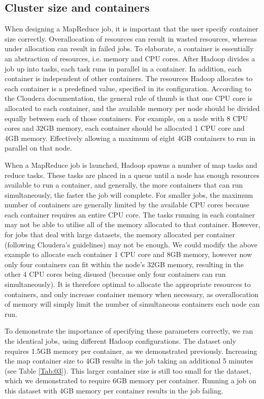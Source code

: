 \documentclass{bioinfo}
\begin{document}
\subsection*{Cluster size and containers}
When designing a MapReduce job, it is important that the user specify container size correctly. Overallocation of resources can result in wasted resources, whereas under allocation can result in failed jobs.
To elaborate, a container is essentially an abstraction of resources, i.e. memory and CPU cores. After Hadoop divides a job up into tasks, each task runs in parallel in a container. In addition, each container is independent of other containers.
The resources Hadoop allocates to each container is a predefined value, specified in its configuration. According to the Cloudera documentation, the general rule of thumb is that one CPU core is allocated to each container, and the available memory per node should be divided equally between each of those containers. For example, on a node with 8 CPU cores and 32GB memory, each container should be allocated 1 CPU core and 4GB memory. Effectively allowing a maximum of eight 4GB containers to run in parallel on that node.

When a MapReduce job is launched, Hadoop spawns a number of map tasks and reduce tasks. These tasks are placed in a queue until a node has enough resources available to run a container, and generally, the more containers that can run simultaneously, the faster the job will complete.
For smaller jobs, the maximum number of containers are generally limited by the available CPU cores because each container requires an entire CPU core. The tasks running in each container may not be able to utilise all of the memory allocated to that container.
However, for jobs that deal with large datasets, the memory allocated per container (following Cloudera's guidelines) may not be enough.
We could modify the above example to allocate each container 1 CPU core and 8GB memory, however now only four containers can fit within the node's 32GB memory, resulting in the other 4 CPU cores being disused (because only four containers can run simultaneously). It is therefore optimal to
allocate the appropriate resources to containers, and only increase container memory when necessary, as overallocation of memory will simply limit the number of simultaneous containers each node can run.

To demonstrate the importance of specifying these parameters correctly, we ran the identical jobs, using different Hadoop configurations. The \OnePhaseone{} dataset only requires 1.5GB memory per container, as we demonstrated previously.
Increasing the map container size to 4GB results in the job taking an additional 5 minutes (see Table \ref{Tab:03}).
This larger container size is still too small for the \FullPhasethree{} dataset, which we demonstrated to require 6GB memory per container. Running a job on this dataset with 4GB memory per container results in the job failing.
\end{document}
